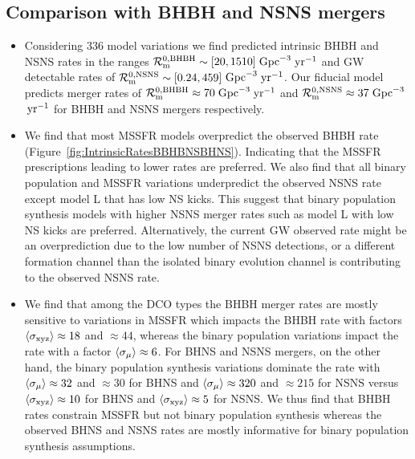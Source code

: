 \documentclass[twocolumn]{aastex63}
\newcommand\rate{\mathcal{R}}
\newcommand\bhnsSingle{BHNS\xspace}
\newcommand{\yearmin}{\ensuremath{\,\rm{yr}^{-1}}\xspace}
\newcommand{\GpcminThree}{\ensuremath{\,\rm{Gpc}^{-3}}\xspace}
\newcommand{\Nmodels}{\ensuremath{336}\xspace}
\newcommand{\RateIntrinsicAzeroBHBH}{\ensuremath{70}\xspace}
\newcommand{\RateIntrinsicAzeroNSNS}{\ensuremath{37}\xspace}
\newcommand{\RateIntrinsicAzeroBHBHmin}{\ensuremath{20}\xspace}
\newcommand{\RateIntrinsicAzeroBHBHmax}{\ensuremath{1510}\xspace}
\newcommand{\RateIntrinsicAzeroNSNSmin}{\ensuremath{0.24}\xspace}
\newcommand{\RateIntrinsicAzeroNSNSmax}{\ensuremath{459}\xspace}
\begin{document}
\subsection{Comparison with \ac{BHBH} and \ac{NSNS} mergers}



\begin{itemize}

\item Considering \Nmodels model variations we find predicted intrinsic \ac{BHBH} and \ac{NSNS} rates in the ranges 
$\rate_{\rm{m}}^{0,\rm{BHBH}} \sim [ \RateIntrinsicAzeroBHBHmin,  \RateIntrinsicAzeroBHBHmax]$\GpcminThree \yearmin and \ac{GW} detectable rates of   $\rate_{\rm{m}}^{0,\rm{NSNS}} \sim [ \RateIntrinsicAzeroNSNSmin,  \RateIntrinsicAzeroNSNSmax]$\GpcminThree \yearmin. 
Our fiducial model predicts merger rates of  $\rate_{\rm{m}}^{0,\rm{BHBH}} \approx  \RateIntrinsicAzeroBHBH$\GpcminThree \yearmin and  $\rate_{\rm{m}}^{0,\rm{NSNS}} \approx  \RateIntrinsicAzeroNSNS$\GpcminThree \yearmin for \ac{BHBH} and \ac{NSNS} mergers respectively.  


\item We find that most \ac{MSSFR} models overpredict the observed \ac{BHBH} rate (Figure~\ref{fig:IntrinsicRatesBBHBNSBHNS}).  Indicating that the \ac{MSSFR} prescriptions leading to lower rates are preferred.  We also find that all binary population and \ac{MSSFR} variations underpredict the observed NSNS rate except model L that has low NS kicks. This suggest that  binary population synthesis models with higher NSNS merger rates such as model L with low  NS kicks are preferred. Alternatively,  the current \ac{GW} observed rate might be an overprediction due to the low number of NSNS detections, or a different formation channel than the isolated binary evolution channel is contributing to the observed NSNS rate. 



\item We find that among the \ac{DCO} types the \ac{BHBH} merger rates are mostly sensitive to variations in \ac{MSSFR} which impacts the BHBH rate with factors  $\langle \sigma_{\rm{xyz}}\rangle  \approx 18$ and $\approx 44$, whereas 
the binary population variations impact the rate with a factor $\langle \sigma_{\rm{\mu}}\rangle \approx 6$. For \bhnsSingle and \ac{NSNS} mergers, on the other hand, the binary population synthesis variations dominate the rate with $\langle \sigma_{\rm{\mu}}\rangle \approx 32$ and $\approx 30$ for \bhnsSingle and  $ \langle \sigma_{\rm{\mu}}\rangle \approx 320$ and $\approx 215$  for NSNS versus $\langle \sigma_{\rm{xyz}}\rangle  \approx 10$ for \bhnsSingle and $\langle \sigma_{\rm{xyz}}\rangle  \approx 5$ for NSNS.  We thus find that BHBH rates constrain \ac{MSSFR} but not binary population synthesis whereas the observed  \bhnsSingle and NSNS rates are mostly informative for binary population synthesis assumptions. 


\end{itemize}
\end{document}
